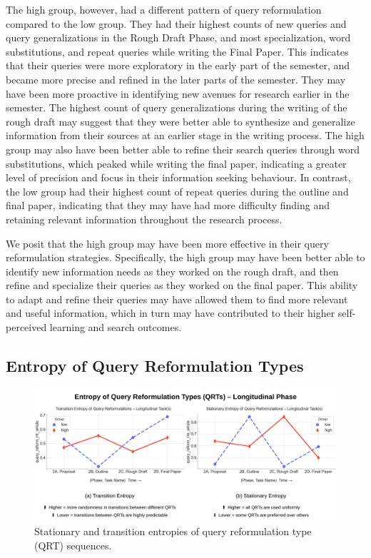 \documentclass[letterpaper, nobind]{templates/ociamthesis}
\begin{document}
The high group, however, had a different pattern of query reformulation compared to the low group.
They had their highest counts of new queries and query generalizations in the Rough Draft Phase, and most specialization, word substitutions, and repeat queries while writing the Final Paper.
This indicates that their queries were more exploratory in the early part of the semester, and became more precise and refined in the later parts of the semester.
They may have been more proactive in identifying new avenues for research earlier in the semester.
The highest count of query generalizations during the writing of the rough draft may suggest that they were better able to synthesize and generalize information from their sources at an earlier stage in the writing process.
The high group may also have been better able to refine their search queries through word substitutions, which peaked while writing the final paper, indicating a greater level of precision and focus in their information seeking behaviour.
In contrast, the low group had their highest count of repeat queries during the outline and final paper, indicating that they may have had more difficulty finding and retaining relevant information throughout the research process.

We posit that the high group may have been more effective in their query reformulation strategies.
Specifically, the high group may have been better able to identify new information needs as they worked on the rough draft, and then refine and specialize their queries as they worked on the final paper.
This ability to adapt and refine their queries may have allowed them to find more relevant and useful information, which in turn may have contributed to their higher self-perceived learning and search outcomes.

\hypertarget{sec-res-phase2-query-H}{%
\subsection{Entropy of Query Reformulation Types}\label{sec-res-phase2-query-H}}

\begin{figure}

{\centering \includegraphics[width=1\linewidth]{figs/rp2-qrt-entropy} 

}

\caption[Entropy of Query Reformulation Types for the Longitudinal Phase.]{Stationary and transition entropies of query reformulation type (QRT) sequences.}\label{fig:rp2-qrt-entropy}
\end{figure}
\end{document}
